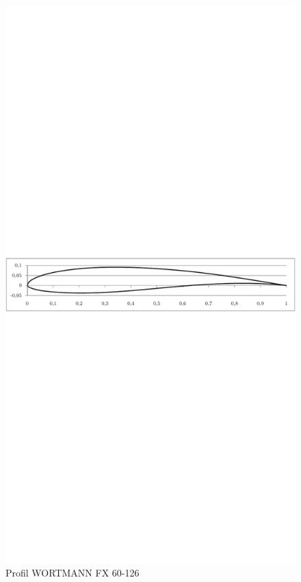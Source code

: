 	\begin{figure}[H]
		\centering
		\includegraphics[]{obrazky/grafy/wortmannp}
		\caption{Profil WORTMANN FX 60-126}
		\label{profil:wort}
	\end{figure}
